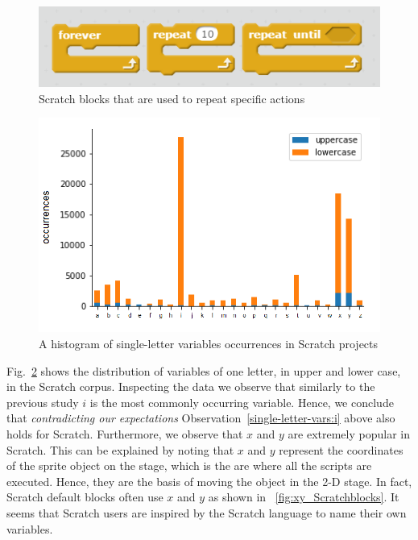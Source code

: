 \documentclass[conference]{IEEEtran}
\begin{document}
\begin{figure}[h]
	\begin{center}
		\includegraphics[width=\columnwidth]{fig/loops_in_Scratch}
		\caption{Scratch blocks that are used to repeat specific actions}
		\label{fig:loop_Scratchblocks}
	\end{center}
\end{figure} 

\begin{figure}[h]
	\begin{center}
		\includegraphics[width=\columnwidth]{fig/varname_singleletter-occurrences}
		\caption{A histogram of single-letter variables occurrences in Scratch projects }
		\label{fig:one_letter_occurrence}
	\end{center}
\end{figure} 
Fig.~\ref{fig:one_letter_occurrence} shows the distribution of variables of one letter, in upper and lower case, in the Scratch corpus. 
Inspecting the data we observe that similarly to the previous study $i$ is the most commonly occurring variable. 
Hence, we conclude that \emph{contradicting our expectations} Observation~\ref{single-letter-vars:i} above also holds for Scratch. 
Furthermore, we observe that $x$ and $y$ are extremely popular in Scratch. 
This can be explained by noting that $x$ and $y$ represent the coordinates of the sprite object on the stage, which is the are where all the scripts are executed. 
Hence, they are the basis of moving the object in the 2-D stage. 
In fact, Scratch default blocks often use $x$ and $y$ as shown in \figurename{~\ref{fig:xy_Scratchblocks}}. 
It seems that Scratch users are inspired by the Scratch language to name their own variables. 
\end{document}
